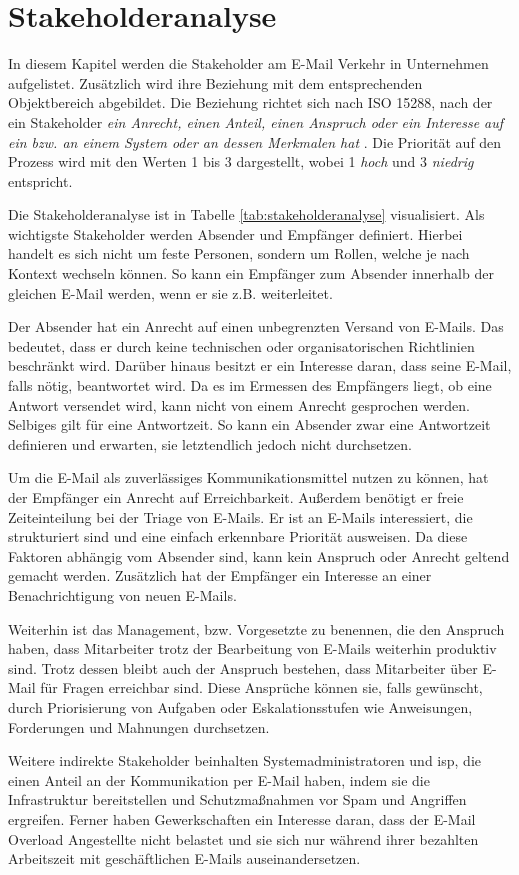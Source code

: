 
\chapter{Stakeholderanalyse}
\label{Stakeholderanalyse}

In diesem Kapitel werden die Stakeholder am E-Mail Verkehr in Unternehmen aufgelistet. Zusätzlich wird ihre Beziehung mit dem entsprechenden Objektbereich abgebildet. Die Beziehung richtet sich nach ISO 15288, nach der ein Stakeholder \emph{\glqq ein Anrecht, einen Anteil, einen Anspruch oder ein Interesse auf ein bzw. an einem System oder an dessen Merkmalen hat\grqq} \citep{ISO2015}. Die Priorität auf den Prozess wird mit den Werten 1 bis 3 dargestellt, wobei 1 \textit{hoch} und 3 \textit{niedrig} entspricht.

Die Stakeholderanalyse ist in Tabelle \ref{tab:stakeholderanalyse} visualisiert. Als wichtigste Stakeholder werden Absender und Empfänger definiert. Hierbei handelt es sich nicht um feste Personen, sondern um Rollen, welche je nach Kontext wechseln können. So kann ein Empfänger zum Absender innerhalb der gleichen E-Mail werden, wenn er sie z.B. weiterleitet.

Der Absender hat ein Anrecht auf einen unbegrenzten Versand von E-Mails. Das bedeutet, dass er durch keine technischen oder organisatorischen Richtlinien beschränkt wird. Darüber hinaus besitzt er ein Interesse daran, dass seine E-Mail, falls nötig, beantwortet wird. Da es im Ermessen des Empfängers liegt, ob eine Antwort versendet wird, kann nicht von einem Anrecht gesprochen werden. Selbiges gilt für eine Antwortzeit. So kann ein Absender zwar eine Antwortzeit definieren und erwarten, sie letztendlich jedoch nicht durchsetzen.

Um die E-Mail als zuverlässiges Kommunikationsmittel nutzen zu können, hat der Empfänger ein Anrecht auf Erreichbarkeit. Außerdem benötigt er freie Zeiteinteilung bei der Triage von E-Mails. Er ist an E-Mails interessiert, die strukturiert sind und eine einfach erkennbare Priorität ausweisen. Da diese Faktoren abhängig vom Absender sind, kann kein Anspruch oder Anrecht geltend gemacht werden. Zusätzlich hat der Empfänger ein Interesse an einer Benachrichtigung von neuen E-Mails.

Weiterhin ist das Management, bzw. Vorgesetzte zu benennen, die den Anspruch haben, dass Mitarbeiter trotz der Bearbeitung von E-Mails weiterhin produktiv sind. Trotz dessen bleibt auch der Anspruch bestehen, dass Mitarbeiter über E-Mail für Fragen erreichbar sind. Diese Ansprüche können sie, falls gewünscht, durch Priorisierung von Aufgaben oder Eskalationsstufen wie Anweisungen, Forderungen und Mahnungen durchsetzen.

Weitere indirekte Stakeholder beinhalten Systemadministratoren und \acrfull{isp}, die einen Anteil an der Kommunikation per E-Mail haben, indem sie die Infrastruktur bereitstellen und Schutzmaßnahmen vor Spam und Angriffen ergreifen. Ferner haben Gewerkschaften ein Interesse daran, dass der E-Mail Overload Angestellte nicht belastet und sie sich nur während ihrer bezahlten Arbeitszeit mit geschäftlichen E-Mails auseinandersetzen.   
